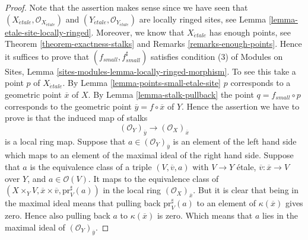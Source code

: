 \documentclass[10pt,a4paper]{amsart}
\theoremstyle{plain}
\theoremstyle{definition}
\theoremstyle{remark}
\numberwithin{equation}{subsection}
\def\etale{{\acute{e}tale}}
\begin{document}
\begin{proof}
Note that the assertion makes sense since we have seen that
$(X_\etale, \mathcal{O}_{X_\etale})$ and
$(Y_\etale, \mathcal{O}_{Y_\etale})$
are locally ringed sites, see
Lemma \ref{lemma-etale-site-locally-ringed}.
Moreover, we know that $X_\etale$ has enough points, see
Theorem \ref{theorem-exactness-stalks}
and
Remarks \ref{remarks-enough-points}.
Hence it suffices to prove that $(f_{small}, f_{small}^\sharp)$
satisfies condition (3) of
Modules on Sites,
Lemma \ref{sites-modules-lemma-locally-ringed-morphism}.
To see this take a point $p$ of $X_\etale$. By
Lemma \ref{lemma-points-small-etale-site}
$p$ corresponds to a geometric point $\overline{x}$ of $X$.
By
Lemma \ref{lemma-stalk-pullback}
the point $q = f_{small} \circ p$ corresponds to the
geometric point $\overline{y} = f \circ \overline{x}$ of $Y$.
Hence the assertion we have to prove is that the induced map
of stalks
$$
(\mathcal{O}_Y)_{\overline{y}} \longrightarrow (\mathcal{O}_X)_{\overline{x}}
$$
is a local ring map. Suppose that $a \in (\mathcal{O}_Y)_{\overline{y}}$
is an element of the left hand side which maps to an element of the maximal
ideal of the right hand side. Suppose that $a$ is the equivalence class
of a triple $(V, \overline{v}, a)$ with $V \to Y$ \'etale,
$\overline{v} : \overline{x} \to V$ over $Y$, and $a \in \mathcal{O}(V)$.
It maps to the equivalence class of
$(X \times_Y V, \overline{x} \times \overline{v}, \text{pr}_V^\sharp(a))$
in the local ring $(\mathcal{O}_X)_{\overline{x}}$. But it is clear that
being in the maximal ideal means that pulling back $\text{pr}_V^\sharp(a)$
to an element of $\kappa(\overline{x})$ gives zero. Hence also pulling back
$a$ to $\kappa(\overline{x})$ is zero. Which means that $a$ lies in the
maximal ideal of $(\mathcal{O}_Y)_{\overline{y}}$.
\end{proof}
\end{document}
